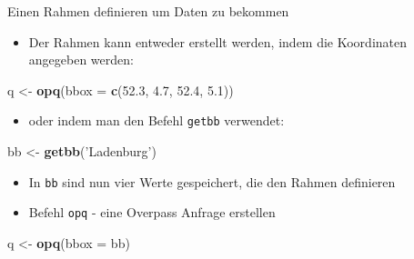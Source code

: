 \documentclass[ignorenonframetext,]{beamer}
\newenvironment{Shaded}{\begin{snugshade}}{\end{snugshade}}
\newcommand{\DataTypeTok}[1]{\textcolor[rgb]{0.13,0.29,0.53}{#1}}
\newcommand{\FloatTok}[1]{\textcolor[rgb]{0.00,0.00,0.81}{#1}}
\newcommand{\KeywordTok}[1]{\textcolor[rgb]{0.13,0.29,0.53}{\textbf{#1}}}
\newcommand{\NormalTok}[1]{#1}
\newcommand{\StringTok}[1]{\textcolor[rgb]{0.31,0.60,0.02}{#1}}
\providecommand{\tightlist}{%
  \setlength{\itemsep}{0pt}\setlength{\parskip}{0pt}}
\begin{document}
\begin{frame}[fragile]{Einen Rahmen definieren um Daten zu bekommen}
\protect\hypertarget{einen-rahmen-definieren-um-daten-zu-bekommen}{}

\begin{itemize}
\tightlist
\item
  Der Rahmen kann entweder erstellt werden, indem die Koordinaten
  angegeben werden:
\end{itemize}

\begin{Shaded}
\begin{Highlighting}[]
\NormalTok{q <-}\StringTok{ }\KeywordTok{opq}\NormalTok{(}\DataTypeTok{bbox =} \KeywordTok{c}\NormalTok{(}\FloatTok{52.3}\NormalTok{, }\FloatTok{4.7}\NormalTok{, }\FloatTok{52.4}\NormalTok{, }\FloatTok{5.1}\NormalTok{))}
\end{Highlighting}
\end{Shaded}

\begin{itemize}
\tightlist
\item
  oder indem man den Befehl \texttt{getbb} verwendet:
\end{itemize}

\begin{Shaded}
\begin{Highlighting}[]
\NormalTok{bb <-}\StringTok{ }\KeywordTok{getbb}\NormalTok{(}\StringTok{'Ladenburg'}\NormalTok{)}
\end{Highlighting}
\end{Shaded}

\begin{itemize}
\item
  In \texttt{bb} sind nun vier Werte gespeichert, die den Rahmen
  definieren
\item
  Befehl \texttt{opq} - eine Overpass Anfrage erstellen
\end{itemize}

\begin{Shaded}
\begin{Highlighting}[]
\NormalTok{q <-}\StringTok{ }\KeywordTok{opq}\NormalTok{(}\DataTypeTok{bbox =}\NormalTok{ bb)}
\end{Highlighting}
\end{Shaded}

\end{frame}
\end{document}

